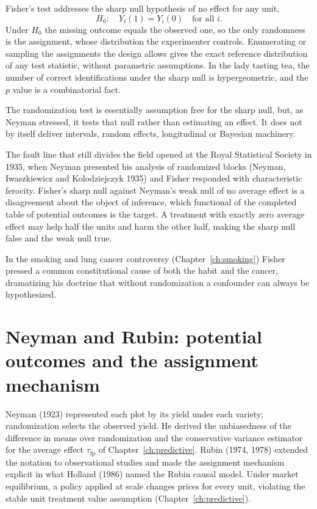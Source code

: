 Fisher's test addresses the sharp null hypothesis of no effect for any unit,
\[
H_0:\quad Y_i(1) = Y_i(0) \quad\text{for all } i.
\]
Under $H_0$ the missing outcome equals the observed one, so the only randomness is the assignment, whose distribution the experimenter controls. Enumerating or sampling the assignments the design allows gives the exact reference distribution of any test statistic, without parametric assumptions. In the lady tasting tea, the number of correct identifications under the sharp null is hypergeometric, and the $p$ value is a combinatorial fact.

The randomization test is essentially assumption free for the sharp null, but, as Neyman stressed, it tests that null rather than estimating an effect. It does not by itself deliver intervals, random effects, longitudinal or Bayesian machinery.

The fault line that still divides the field opened at the Royal Statistical Society in 1935, when Neyman presented his analysis of randomized blocks (Neyman, Iwaszkiewicz and Kolodziejczyk 1935) and Fisher responded with characteristic ferocity. Fisher's sharp null against Neyman's weak null of no average effect is a disagreement about the object of inference, which functional of the completed table of potential outcomes is the target. A treatment with exactly zero average effect may help half the units and harm the other half, making the sharp null false and the weak null true.

In the smoking and lung cancer controversy (Chapter~\ref{ch:smoking}) Fisher pressed a common constitutional cause of both the habit and the cancer, dramatizing his doctrine that without randomization a confounder can always be hypothesized.

\section{Neyman and Rubin: potential outcomes and the assignment mechanism}\label{fw:sec:rubin}

Neyman (1923) represented each plot by its yield under each variety; randomization selects the observed yield. He derived the unbiasedness of the difference in means over randomization and the conservative variance estimator for the average effect $\tau_{\mathrm{fp}}$ of Chapter~\ref{ch:predictive}. Rubin (1974, 1978) extended the notation to observational studies and made the assignment mechanism explicit in what Holland (1986) named the Rubin causal model. Under market equilibrium, a policy applied at scale changes prices for every unit, violating the stable unit treatment value assumption (Chapter~\ref{ch:predictive}).

